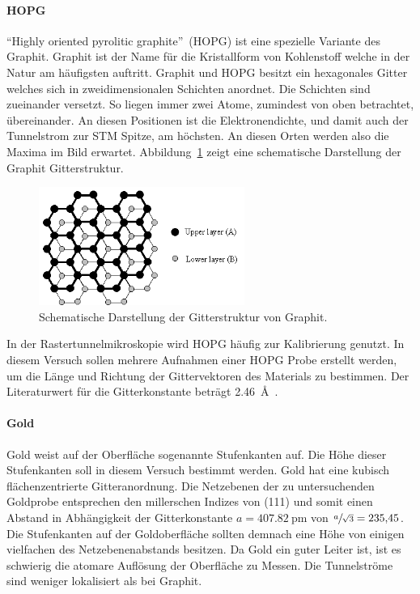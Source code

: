 \paragraph{HOPG}
\enquote{Highly oriented pyrolitic graphite}~(HOPG) ist eine spezielle Variante des Graphit.
Graphit ist der Name für die Kristallform von Kohlenstoff welche in der Natur am häufigsten auftritt. Graphit und HOPG besitzt ein hexagonales Gitter  welches sich in zweidimensionalen
Schichten anordnet. Die Schichten sind zueinander versetzt. So liegen immer zwei Atome, zumindest von oben betrachtet,  übereinander. An diesen
Positionen ist die Elektronendichte, und damit auch der Tunnelstrom zur STM Spitze, am höchsten. An diesen Orten werden also die Maxima im Bild erwartet.
Abbildung~\ref{fig:hopg_structure} zeigt eine schematische Darstellung der Graphit Gitterstruktur.
\begin{figure}
  \centering
  \includegraphics[width=0.6\textwidth]{images/hopg_structure.png}
  \caption{Schematische Darstellung der Gitterstruktur von Graphit.\cite{hopg_structure}}
  \label{fig:hopg_structure}
\end{figure}
In der Rastertunnelmikroskopie wird HOPG häufig zur Kalibrierung genutzt.
In diesem Versuch sollen mehrere Aufnahmen einer HOPG Probe erstellt werden,
um die Länge und Richtung der Gittervektoren des Materials zu bestimmen.
Der Literaturwert für die Gitterkonstante beträgt \SI{2.46}{\angstrom}~\cite{stm1}.

\paragraph{Gold}
Gold weist auf der Oberfläche sogenannte Stufenkanten auf. Die Höhe dieser Stufenkanten soll in diesem Versuch bestimmt werden.
Gold hat eine kubisch flächenzentrierte Gitteranordnung. Die Netzebenen der zu untersuchenden Goldprobe entsprechen den millerschen Indizes von  (111)
und somit einen Abstand in Abhängigkeit der Gitterkonstante $a=\SI{407.82}{\pico\meter}$ von $\sfrac{a}{\sqrt{3}} = \num{235.45}$\cite{stm_gold}.
Die Stufenkanten auf der Goldoberfläche sollten demnach eine Höhe von einigen vielfachen des Netzebenenabstands besitzen.
Da Gold ein guter Leiter ist, ist es schwierig die atomare Auflösung der Oberfläche zu Messen. Die Tunnelströme sind weniger lokalisiert
als bei Graphit.
